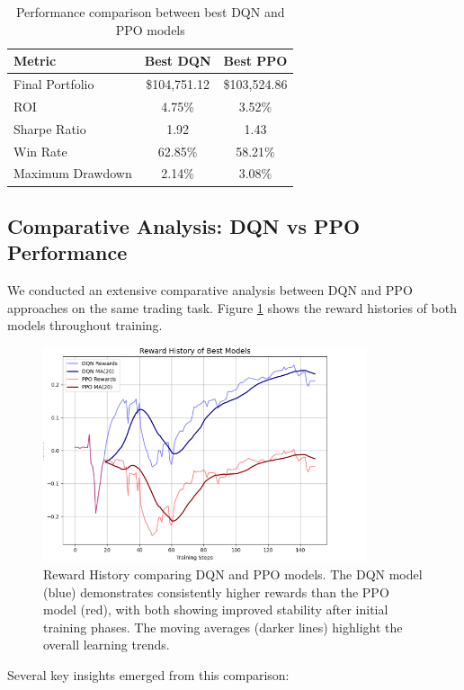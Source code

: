 \documentclass[11pt]{article}
\begin{document}
\begin{table}[h]
\centering
\begin{tabular}{|l|c|c|}
\hline
\textbf{Metric} & \textbf{Best DQN} & \textbf{Best PPO} \\
\hline
Final Portfolio & \$104,751.12 & \$103,524.86 \\
ROI & 4.75\% & 3.52\% \\
Sharpe Ratio & 1.92 & 1.43 \\
Win Rate & 62.85\% & 58.21\% \\
Maximum Drawdown & 2.14\% & 3.08\% \\
\hline
\end{tabular}
\caption{Performance comparison between best DQN and PPO models}
\end{table}

\subsection{Comparative Analysis: DQN vs PPO Performance}
We conducted an extensive comparative analysis between DQN and PPO approaches on the same trading task. Figure \ref{fig:reward_history} shows the reward histories of both models throughout training.

\begin{figure}[h]
  \centering
  \includegraphics[width=0.85\textwidth]{fig/Reward History Best Model.png}
  \caption{Reward History comparing DQN and PPO models. The DQN model (blue) demonstrates consistently higher rewards than the PPO model (red), with both showing improved stability after initial training phases. The moving averages (darker lines) highlight the overall learning trends.}
  \label{fig:reward_history}
\end{figure}

Several key insights emerged from this comparison:
\end{document}
